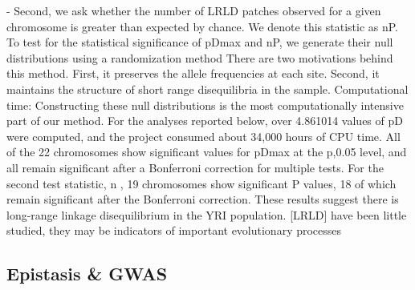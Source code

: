 -	Second, we ask whether the number of LRLD patches observed for a given chromosome is greater than expected by chance. We denote this statistic as nP. \cite{koch2013long}
To test for the statistical significance of pDmax and nP, we generate their null distributions using a randomization method \cite{koch2013long}
There are two motivations behind this method. First, it preserves the allele frequencies at each site. Second, it maintains the structure of short range disequilibria in the sample.  \cite{koch2013long}
Computational time: Constructing these null distributions is the most computationally intensive part of our method. For the analyses reported below, over 4.861014 values of pD were computed, and the project consumed about 34,000 hours of CPU time. \cite{koch2013long}
All of the 22 chromosomes show significant values for pDmax at the p,0.05 level, and all remain significant after a Bonferroni correction for multiple tests. For the second test statistic, n , 19 chromosomes show significant P values, 18 of which remain significant after the Bonferroni correction. These results suggest there is long-range linkage disequilibrium in the YRI population. \cite{koch2013long}
[LRLD] have been little studied, they may be indicators of important evolutionary processes \cite{koch2013long}

\subsection{Epistasis \& GWAS}



